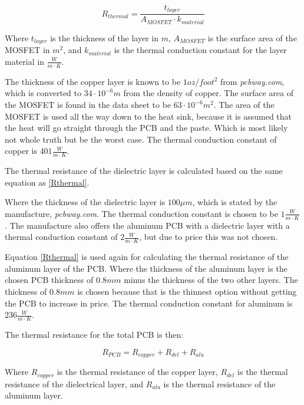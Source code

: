     \begin{equation}
        R_{thermal} = \frac{t_{layer}}{A_{MOSFET} \cdot k_{material}} 
        \label{Rthermal}
    \end{equation}
    
Where $t_{layer}$ is the thickness of the layer in $m$, $A_{MOSFET}$ is the surface area of the MOSFET in $m^2$, and $k_{material}$ is the thermal conduction constant for the layer material in $\frac{W}{m \cdot K}$.

The thickness of the copper layer is known to be $1 oz/foot^2$ from \textit{pcbway.com}, which is converted to $34 \cdot 10^{-6} m$ from the density of copper. The surface area of the MOSFET is found in the data sheet to be $63 \cdot 10^{-6} m^2$.\cite{mosfet} The area of the MOSFET is used all the way down to the heat sink, because it is assumed that the heat will go straight through the PCB and the paste. 
Which is most likely not whole truth but be the worst case.
The thermal conduction constant of copper is $401 \frac{W}{m \cdot K}$.\cite{toolbox}

The thermal resistance of the dielectric layer is calculated based on the same equation as \ref{Rthermal}.

Where the thickness of the dielectric layer is $100 \mu m$, which is stated by the manufacture, \textit{pcbway.com}. The thermal conduction constant is chosen to be $1 \frac{W}{m \cdot K}$. The manufacture also offers the aluminum PCB with a dielectric layer with a thermal conduction constant of $2 \frac{W}{m \cdot K}$, but due to price this was not chosen.

Equation \ref{Rthermal} is used again for calculating the thermal resistance of the aluminum layer of the PCB.
Where the thickness of the aluminum layer is the chosen PCB thickness of $0.8 mm$ minus the thickness of the two other layers. The thickness of $0.8 mm$ is chosen because that is the thinnest option without getting the PCB to increase in price. The thermal conduction constant for aluminum is $236 \frac{W}{m \cdot K}$.\cite{toolbox}

The thermal resistance for the total PCB is then:

    \begin{equation}
        R_{PCB} = R_{copper} + R_{del} + R_{alu}
        \label{RPCB}
    \end{equation}

Where $R_{copper}$ is the thermal resistance of the copper layer, $R_{del}$ is the thermal resistance of the dielectrical layer, and $R_{alu}$ is the thermal resistance of the aluminum layer.

